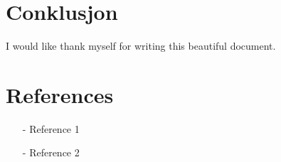 \documentclass[reprint,english,notitlepage]{revtex4-1}  %
\begin{document}
\section{Conklusjon}
\begin{acknowledgments}  %
I would like thank myself for writing this beautiful document.
\end{acknowledgments}


\section*{References}  %
\begin{itemize}
\item[-]Reference 1
\item[-]Reference 2
\end{itemize}

\newpage
\appendix
\end{document}
